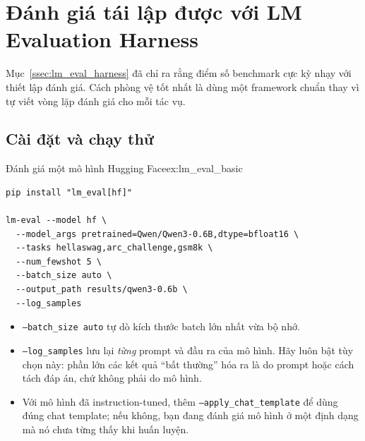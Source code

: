
\section{Đánh giá tái lập được với LM Evaluation Harness}
\label{sec:lm_eval_practice}

Mục~\ref{ssec:lm_eval_harness} đã chỉ ra rằng điểm số benchmark cực kỳ nhạy với thiết lập đánh giá. Cách phòng vệ tốt nhất là dùng một framework chuẩn thay vì tự viết vòng lặp đánh giá cho mỗi tác vụ.

\subsection{Cài đặt và chạy thử}
\label{ssec:lm_eval_setup}
\begin{example}{Đánh giá một mô hình Hugging Face}{ex:lm_eval_basic}
\begin{verbatim}
pip install "lm_eval[hf]"

lm-eval --model hf \
  --model_args pretrained=Qwen/Qwen3-0.6B,dtype=bfloat16 \
  --tasks hellaswag,arc_challenge,gsm8k \
  --num_fewshot 5 \
  --batch_size auto \
  --output_path results/qwen3-0.6b \
  --log_samples
\end{verbatim}
\end{example}
\begin{itemize}
	\item \texttt{--batch\_size auto} tự dò kích thước batch lớn nhất vừa bộ nhớ.
	\item \texttt{--log\_samples} lưu lại \emph{từng} prompt và đầu ra của mô hình. Hãy luôn bật tùy chọn này: phần lớn các kết quả “bất thường” hóa ra là do prompt hoặc cách tách đáp án, chứ không phải do mô hình.
	\item Với mô hình đã instruction-tuned, thêm \texttt{--apply\_\allowbreak chat\_\allowbreak template} để dùng đúng chat template; nếu không, bạn đang đánh giá mô hình ở một định dạng mà nó chưa từng thấy khi huấn luyện.
\end{itemize}

